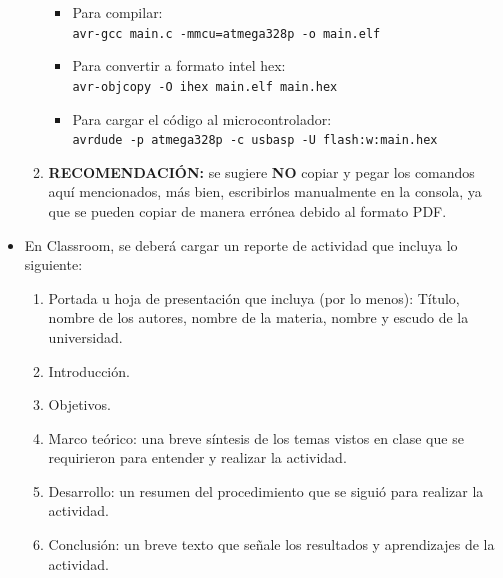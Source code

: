 \documentclass[10pt,letterpaper]{article}
\begin{document}
\begin{itemize}
\begin{enumerate}
        \begin{itemize}
            \item Para compilar: \\ 
                \texttt{avr-gcc main.c -mmcu=atmega328p -o main.elf}
            \item Para convertir a formato intel hex: \\
                \texttt{avr-objcopy -O ihex main.elf main.hex}
            \item Para cargar el código al microcontrolador: \\
                \texttt{avrdude -p atmega328p -c usbasp -U flash:w:main.hex}
        \end{itemize}
        \item \textbf{RECOMENDACIÓN:} se sugiere \textbf{NO} copiar y pegar los comandos aquí mencionados, más bien, escribirlos manualmente en la consola, ya que se pueden copiar de manera errónea debido al formato PDF.
    \end{enumerate}
    \item En Classroom, se deberá cargar un reporte de actividad que incluya lo siguiente:
    \begin{enumerate}%
        \item Portada u hoja de presentación que incluya (por lo menos): Título, nombre de los autores, nombre de la materia, nombre y escudo de la universidad.
        \item Introducción.
        \item Objetivos.
        \item Marco teórico: una breve síntesis de los temas vistos en clase que se requirieron para entender y realizar la actividad.
        \item Desarrollo: un resumen del procedimiento que se siguió para realizar la actividad.
        \item Conclusión: un breve texto que señale los resultados y aprendizajes de la actividad.
    \end{enumerate}
\end{itemize}
\end{document}
